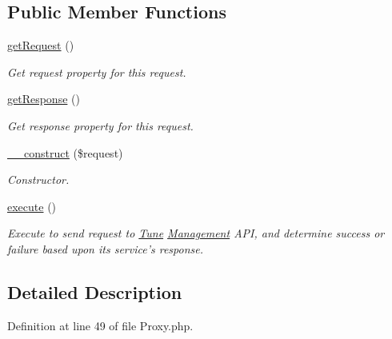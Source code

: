 \subsection*{Public Member Functions}
\begin{DoxyCompactItemize}
\item 
\hyperlink{classTune_1_1Management_1_1Service_1_1Proxy_a61182e1f48960d309fb18492b7b612a6}{get\-Request} ()
\begin{DoxyCompactList}\small\item\em Get request property for this request. \end{DoxyCompactList}\item 
\hyperlink{classTune_1_1Management_1_1Service_1_1Proxy_aad9c18285a8ccb04a24c35909d402719}{get\-Response} ()
\begin{DoxyCompactList}\small\item\em Get response property for this request. \end{DoxyCompactList}\item 
\hyperlink{classTune_1_1Management_1_1Service_1_1Proxy_a9b6e20e49484e5cb55499d0a8b4ac2d3}{\-\_\-\-\_\-construct} (\$request)
\begin{DoxyCompactList}\small\item\em Constructor. \end{DoxyCompactList}\item 
\hyperlink{classTune_1_1Management_1_1Service_1_1Proxy_a680f1cf96a9ecec08d7cb5393938350c}{execute} ()
\begin{DoxyCompactList}\small\item\em Execute to send request to \hyperlink{namespaceTune}{Tune} \hyperlink{namespaceTune_1_1Management}{Management} A\-P\-I, and determine success or failure based upon its service's response. \end{DoxyCompactList}\end{DoxyCompactItemize}


\subsection{Detailed Description}


Definition at line 49 of file Proxy.\-php.



